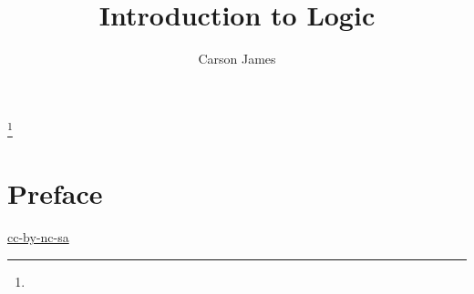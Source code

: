 \documentclass{book}
\begin{document}
	
	\frontmatter
	
	\title{Introduction to Logic}
	
	
	\author{Carson James}
	\thanks{}
	
	\date{}
	
	\maketitle
	
	
	\setcounter{page}{4}
	
	\tableofcontents
	\printunsrtglossary[type=symbols,style=long,title={Notation}]
	
	
	\mainmatter
	
	\chapter*{Preface}
	
	\begin{flushleft}
		\href{https://creativecommons.org/licenses/by-nc-sa/4.0/legalcode.txt}{cc-by-nc-sa}
	\end{flushleft}
	
	\newpage
	
	








   
   
   
   
   
   
   
   
   
   
\end{document}
